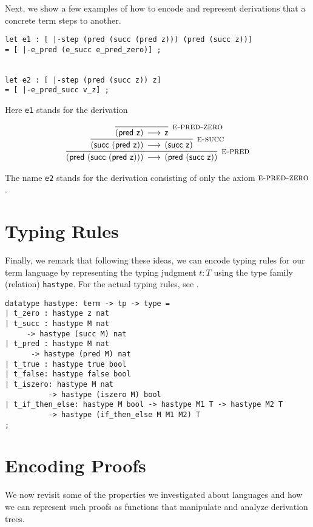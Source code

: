 Next, we show a few examples of how to encode and represent
derivations that a concrete term steps to another.

\begin{lstlisting}
let e1 : [ |-step (pred (succ (pred z))) (pred (succ z))]
= [ |-e_pred (e_succ e_pred_zero)] ;


let e2 : [ |-step (pred (succ z)) z]
= [ |-e_pred_succ v_z] ;
\end{lstlisting}


Here \lstinline!e1! stands for the derivation 


\[
\begin{array}{c}
\infer[\SPRED]{(\tmpred {(\tmsucc {(\tmpred {\tmzero})})}) \steps (\tmpred {(\tmsucc {\tmzero})})}
{\infer[\SSUC]{(\tmsucc {(\tmpred {\tmzero})}) \steps (\tmsucc {\tmzero} )}
 {\infer[\SPREDZ]{(\tmpred {\tmzero}) \steps \tmzero}{}}
}
\end{array}
\]

The name \lstinline!e2! stands for the derivation consisting of only
the axiom $\textsc{e-pred-zero}$.

\section{Typing Rules}
Finally, we remark that following these ideas, we can encode typing rules for
our term language by representing the typing judgment $t : T$ using the type
family (relation) \lstinline!hastype!. For the actual typing rules,
see \cite[Ch ?, Fig. ?]{TAPL}.


\begin{lstlisting}
datatype hastype: term -> tp -> type =
| t_zero : hastype z nat
| t_succ : hastype M nat 
     -> hastype (succ M) nat
| t_pred : hastype M nat
      -> hastype (pred M) nat
| t_true : hastype true bool
| t_false: hastype false bool
| t_iszero: hastype M nat
          -> hastype (iszero M) bool
| t_if_then_else: hastype M bool -> hastype M1 T -> hastype M2 T
          -> hastype (if_then_else M M1 M2) T
;
\end{lstlisting}



\section{Encoding Proofs}
We now revisit some of the properties we investigated about languages
and how we can represent such proofs as functions that manipulate and
analyze derivation trees. 

